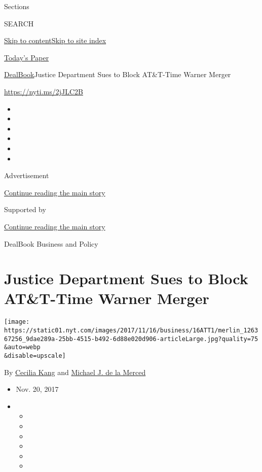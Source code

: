 Sections

SEARCH

\protect\hyperlink{site-content}{Skip to
content}\protect\hyperlink{site-index}{Skip to site index}

\href{https://myaccount.nytimes.com/auth/login?response_type=cookie\&client_id=vi}{}

\href{https://www.nytimes.com/section/todayspaper}{Today's Paper}

\href{/section/business/dealbook}{DealBook}\textbar{}Justice Department
Sues to Block AT\&T-Time Warner Merger

\url{https://nyti.ms/2jJLC2B}

\begin{itemize}
\item
\item
\item
\item
\item
\item
\end{itemize}

Advertisement

\protect\hyperlink{after-top}{Continue reading the main story}

Supported by

\protect\hyperlink{after-sponsor}{Continue reading the main story}

DealBook Business and Policy

\hypertarget{justice-department-sues-to-block-att-time-warner-merger}{%
\section{Justice Department Sues to Block AT\&T-Time Warner
Merger}\label{justice-department-sues-to-block-att-time-warner-merger}}

\texttt{[image: https://static01.nyt.com/images/2017/11/16/business/16ATT1/merlin\_126367256\_9dae289a-25bb-4515-b492-6d88e020d906-articleLarge.jpg?quality=75\\\&auto=webp\\\&disable=upscale]}

By \href{http://www.nytimes.com/by/cecilia-kang}{Cecilia Kang} and
\href{http://www.nytimes.com/by/michael-j-de-la-merced}{Michael J. de la
Merced}

\begin{itemize}
\item
  Nov. 20, 2017
\item
  \begin{itemize}
  \item
  \item
  \item
  \item
  \item
  \item
  \end{itemize}
\end{itemize}

